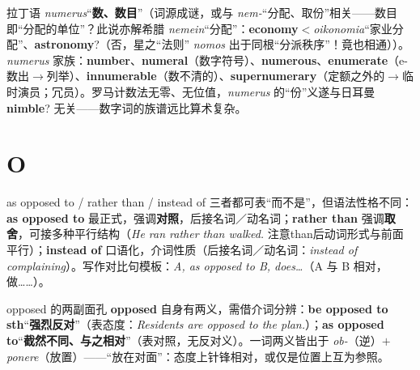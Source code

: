 \documentclass[../main.tex]{subfiles}
\begin{document}


\begin{origin}
拉丁语 \textit{numerus}“\textbf{数、数目}”（词源成谜，或与 \textit{nem-}“分配、取份”相关——数目即“分配的单位”？此说亦解希腊 \textit{nemein}“分配”：\textbf{economy}$<$\textit{oikonomia}“家业分配”、\textbf{astronomy}?（否，星之“法则” \textit{nomos} 出于同根“分派秩序”！竟也相通））。\textit{numerus} 家族：\textbf{number}、\textbf{numeral}（数字符号）、\textbf{numerous}、\textbf{enumerate}（e- 数出$\to$列举）、\textbf{innumerable}（数不清的）、\textbf{supernumerary}（定额之外的$\to$临时演员；冗员）。罗马计数法无零、无位值，\textit{numerus} 的“份”义遂与日耳曼 \textbf{nimble}? 无关——数字词的族谱远比算术复杂。
\end{origin}

\section{O}



\begin{gram}{as opposed to / rather than / instead of}
三者都可表“而不是”，但语法性格不同：\textbf{as opposed to} 最正式，强调\textbf{对照}，后接名词／动名词；\textbf{rather than} 强调\textbf{取舍}，可接多种平行结构（\textit{He ran rather than walked.} 注意than后动词形式与前面平行）；\textbf{instead of} 口语化，介词性质（后接名词／动名词：\textit{instead of complaining}）。写作对比句模板：\textit{A, as opposed to B, does\dots}（A 与 B 相对，做……）。
\end{gram}

\begin{gram}{opposed 的两副面孔}
\textbf{opposed} 自身有两义，需借介词分辨：\textbf{be opposed to sth}“\textbf{强烈反对}”（表态度：\textit{Residents are opposed to the plan.}）；\textbf{as opposed to}“\textbf{截然不同、与之相对}”（表对照，无反对义）。一词两义皆出于 \textit{ob-}（逆）$+$ \textit{ponere}（放置）——“放在对面”：态度上针锋相对，或仅是位置上互为参照。
\end{gram}
\end{document}
